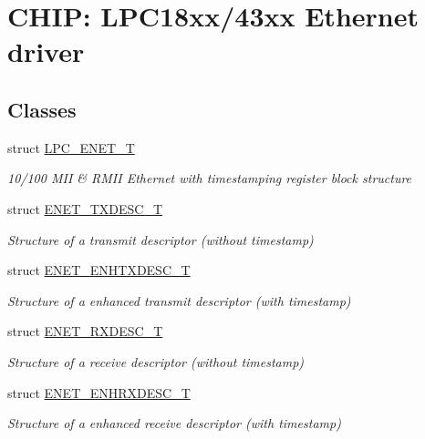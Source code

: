 \hypertarget{group___e_n_e_t__18_x_x__43_x_x}{}\section{C\+H\+IP\+: L\+P\+C18xx/43xx Ethernet driver}
\label{group___e_n_e_t__18_x_x__43_x_x}
\subsection*{Classes}
\begin{DoxyCompactItemize}
\item 
struct \hyperlink{struct_l_p_c___e_n_e_t___t}{L\+P\+C\+\_\+\+E\+N\+E\+T\+\_\+T}
\begin{DoxyCompactList}\small\item\em 10/100 M\+II \& R\+M\+II Ethernet with timestamping register block structure \end{DoxyCompactList}\item 
struct \hyperlink{struct_e_n_e_t___t_x_d_e_s_c___t}{E\+N\+E\+T\+\_\+\+T\+X\+D\+E\+S\+C\+\_\+T}
\begin{DoxyCompactList}\small\item\em Structure of a transmit descriptor (without timestamp) \end{DoxyCompactList}\item 
struct \hyperlink{struct_e_n_e_t___e_n_h_t_x_d_e_s_c___t}{E\+N\+E\+T\+\_\+\+E\+N\+H\+T\+X\+D\+E\+S\+C\+\_\+T}
\begin{DoxyCompactList}\small\item\em Structure of a enhanced transmit descriptor (with timestamp) \end{DoxyCompactList}\item 
struct \hyperlink{struct_e_n_e_t___r_x_d_e_s_c___t}{E\+N\+E\+T\+\_\+\+R\+X\+D\+E\+S\+C\+\_\+T}
\begin{DoxyCompactList}\small\item\em Structure of a receive descriptor (without timestamp) \end{DoxyCompactList}\item 
struct \hyperlink{struct_e_n_e_t___e_n_h_r_x_d_e_s_c___t}{E\+N\+E\+T\+\_\+\+E\+N\+H\+R\+X\+D\+E\+S\+C\+\_\+T}
\begin{DoxyCompactList}\small\item\em Structure of a enhanced receive descriptor (with timestamp) \end{DoxyCompactList}\end{DoxyCompactItemize}
